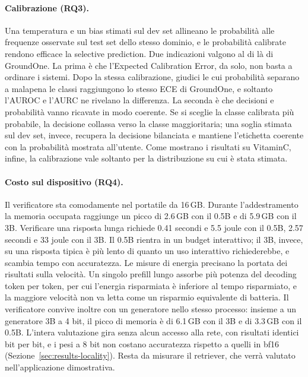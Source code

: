 \paragraph{Calibrazione (RQ3).} Una temperatura e un bias stimati sul dev set allineano le probabilità alle frequenze
osservate sul test set dello stesso dominio, e le probabilità calibrate rendono efficace la selective prediction. Due
indicazioni valgono al di là di GroundOne. La prima è che l'Expected Calibration Error, da solo, non basta a ordinare i
sistemi. Dopo la stessa calibrazione, giudici le cui probabilità separano a malapena le classi raggiungono lo stesso ECE
di GroundOne, e soltanto l'AUROC e l'AURC ne rivelano la differenza. La seconda è che decisioni e
probabilità vanno ricavate in modo coerente. Se si sceglie la classe calibrata più probabile, la decisione collassa verso
la classe maggioritaria; una soglia stimata sul dev set, invece, recupera la decisione bilanciata e mantiene l'etichetta
coerente con la probabilità mostrata all'utente. Come mostrano i risultati su VitaminC, infine, la calibrazione vale
soltanto per la distribuzione su cui è stata stimata.

\paragraph{Costo sul dispositivo (RQ4).} Il verificatore sta comodamente nel portatile da 16\,GB. Durante
l'addestramento la memoria occupata raggiunge un picco di 2.6\,GB con il 0.5B e di 5.9\,GB con il 3B. Verificare una
risposta lunga richiede 0.41 secondi e 5.5 joule con il 0.5B, 2.57 secondi e 33 joule con il 3B. Il 0.5B rientra in un
budget interattivo; il 3B, invece, su una risposta tipica è più lento di quanto un uso interattivo richiederebbe, e
scambia tempo con accuratezza. Le misure di energia precisano la portata dei risultati sulla velocità. Un singolo
prefill lungo assorbe più potenza del decoding token per token, per cui l'energia risparmiata è inferiore al tempo
risparmiato, e la maggiore velocità non va letta come un risparmio equivalente di batteria. Il verificatore convive
inoltre con un generatore nello stesso processo: insieme a un generatore 3B a 4 bit, il picco di memoria è di 6.1\,GB con
il 3B e di 3.3\,GB con il 0.5B. L'intera valutazione gira senza alcun accesso alla rete, con risultati identici bit per
bit, e i pesi a 8 bit non costano accuratezza rispetto a quelli in bf16 (Sezione~\ref{sec:results-locality}). Resta da
misurare il retriever, che verrà valutato nell'applicazione dimostrativa.

